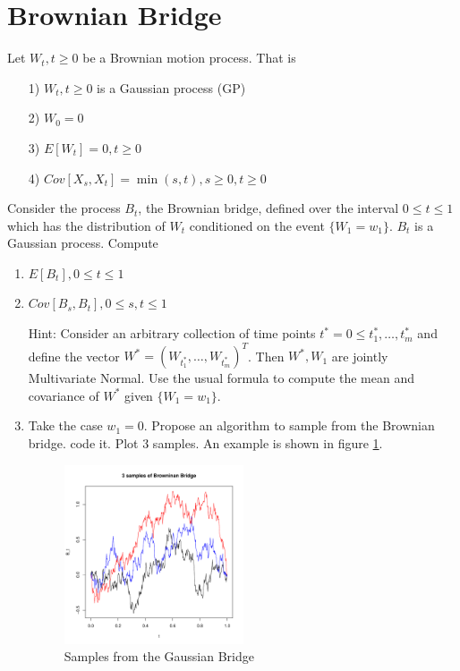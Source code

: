 \documentclass{article}[12pt]
\begin{document}
\section{Brownian Bridge}
Let $W_t, t \geq 0$ be a Brownian motion process. That is 
\begin{enumerate}
\item[1)] $W_t, t\geq 0$ is a Gaussian process (GP)
\item[2)] $W_0=0$
\item[3)] $E[W_t]=0, t \geq 0$
\item[4)] $Cov[X_s,X_t]=\min(s,t), s \geq 0, t \geq 0$
\end{enumerate}
Consider the process $B_t$, the Brownian bridge, defined over the interval $0 \leq t \leq 1$ which has the distribution of $W_t$ conditioned on the event $\{W_1=w_1\}$. $B_t$ is a Gaussian process. Compute
\begin{enumerate}
\item$ E[B_t], 0 \leq t \leq 1$
\item $Cov[B_s,B_t], 0 \leq s,t \leq 1$

Hint: Consider an arbitrary collection of time points $t^*=0 \leq t_1^*,\ldots,t_m^*$ and define the vector $W^*=(W_{t_1^*},\ldots,W_{t_m^*})^T$. Then $W^*,W_1$ are jointly Multivariate Normal. Use the usual formula to compute the mean and covariance  of $W^*$ given $\{W_1=w_1\}$. 

\item Take the case $w_1=0$. Propose an algorithm to sample from the Brownian bridge. code it. Plot 3 samples. 
An example is shown in figure \ref{fig:GB}. 
\begin{figure}
\includegraphics[width=0.5\textwidth]{BB.pdf}
\caption{\label{fig:GB}Samples from the Gaussian Bridge}
\end{figure}
 
\end{enumerate}
\end{document}
